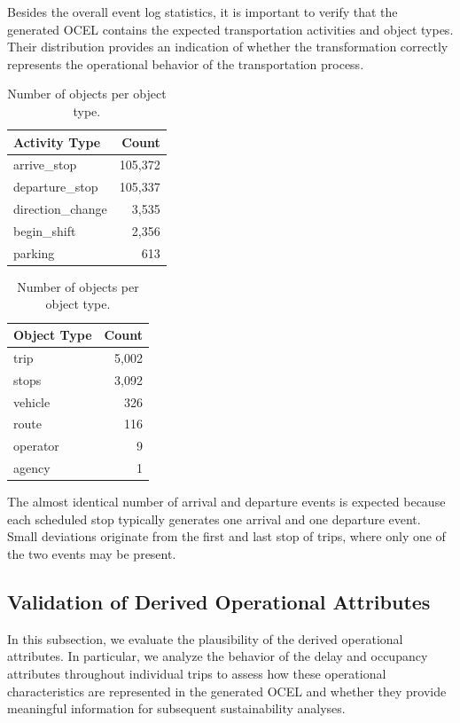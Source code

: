 Besides the overall event log statistics, it is important to verify that the generated OCEL contains the expected transportation activities and object types. Their distribution provides an indication of whether the transformation correctly represents the operational behavior of the transportation process.
\begin{table}[h]
\centering
\begin{minipage}[t]{0.45\textwidth}
\caption{Number of events per event type.}
\centering
\begin{tabular}{lr}
\toprule
\textbf{Activity Type} & \textbf{Count} \\
\midrule
arrive\_stop & 105,372 \\
departure\_stop & 105,337 \\
direction\_change & 3,535 \\
begin\_shift & 2,356 \\
parking & 613 \\
\bottomrule
\end{tabular}

\label{tab:event_type_counts}
\end{minipage}
\hfill
\begin{minipage}[t]{0.45\textwidth}
\caption{Number of objects per object type.}
\centering
\begin{tabular}{lr}
\toprule
\textbf{Object Type} & \textbf{Count} \\
\midrule
trip & 5,002 \\
stops & 3,092 \\
vehicle & 326 \\
route & 116 \\
operator & 9 \\
agency & 1 \\
\bottomrule
\end{tabular}
\label{tab:object_type_counts}
\end{minipage}
\end{table}
The almost identical number of arrival and departure events is expected because each scheduled stop typically generates one arrival and one departure event. Small deviations originate from the first and last stop of trips, where only one of the two events may be present.

\subsection{Validation of Derived Operational Attributes
}
In this subsection, we evaluate the plausibility of the derived operational attributes. In particular, we analyze the behavior of the delay and occupancy attributes throughout individual trips to assess how these operational characteristics are represented in the generated OCEL and whether they provide meaningful information for subsequent sustainability analyses.


